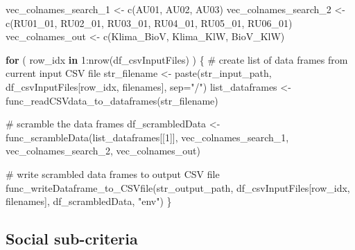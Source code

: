 \documentclass[
]{article}
\newenvironment{Shaded}{\begin{snugshade}}{\end{snugshade}}
\newcommand{\AttributeTok}[1]{\textcolor[rgb]{0.00,0.34,0.68}{#1}}
\newcommand{\CommentTok}[1]{\textcolor[rgb]{0.54,0.53,0.53}{#1}}
\newcommand{\ControlFlowTok}[1]{\textcolor[rgb]{0.12,0.11,0.11}{\textbf{#1}}}
\newcommand{\DecValTok}[1]{\textcolor[rgb]{0.69,0.50,0.00}{#1}}
\newcommand{\FunctionTok}[1]{\textcolor[rgb]{0.39,0.29,0.61}{#1}}
\newcommand{\NormalTok}[1]{\textcolor[rgb]{0.12,0.11,0.11}{#1}}
\newcommand{\OtherTok}[1]{\textcolor[rgb]{0.00,0.43,0.16}{#1}}
\newcommand{\SpecialCharTok}[1]{\textcolor[rgb]{0.24,0.68,0.91}{#1}}
\newcommand{\StringTok}[1]{\textcolor[rgb]{0.75,0.01,0.01}{#1}}
\begin{document}
\begin{Shaded}
\begin{Highlighting}[]
\NormalTok{vec\_colnames\_search\_1 }\OtherTok{\textless{}{-}} \FunctionTok{c}\NormalTok{(}\StringTok{\textquotesingle{}AU01\textquotesingle{}}\NormalTok{, }\StringTok{\textquotesingle{}AU02\textquotesingle{}}\NormalTok{, }\StringTok{\textquotesingle{}AU03\textquotesingle{}}\NormalTok{)}
\NormalTok{vec\_colnames\_search\_2 }\OtherTok{\textless{}{-}} \FunctionTok{c}\NormalTok{(}\StringTok{\textquotesingle{}RU01\_01\textquotesingle{}}\NormalTok{, }\StringTok{\textquotesingle{}RU02\_01\textquotesingle{}}\NormalTok{, }\StringTok{\textquotesingle{}RU03\_01\textquotesingle{}}\NormalTok{, }\StringTok{\textquotesingle{}RU04\_01\textquotesingle{}}\NormalTok{, }\StringTok{\textquotesingle{}RU05\_01\textquotesingle{}}\NormalTok{, }\StringTok{\textquotesingle{}RU06\_01\textquotesingle{}}\NormalTok{)}
\NormalTok{vec\_colnames\_out }\OtherTok{\textless{}{-}} \FunctionTok{c}\NormalTok{(}\StringTok{\textquotesingle{}Klima\_BioV\textquotesingle{}}\NormalTok{, }\StringTok{\textquotesingle{}Klima\_KlW\textquotesingle{}}\NormalTok{, }\StringTok{\textquotesingle{}BioV\_KlW\textquotesingle{}}\NormalTok{)}

\ControlFlowTok{for}\NormalTok{ ( row\_idx }\ControlFlowTok{in} \DecValTok{1}\SpecialCharTok{:}\FunctionTok{nrow}\NormalTok{(df\_csvInputFiles) ) \{}
  \CommentTok{\# create list of data frames from current input CSV file}
\NormalTok{  str\_filename }\OtherTok{\textless{}{-}} \FunctionTok{paste}\NormalTok{(str\_input\_path, df\_csvInputFiles[row\_idx, filenames], }\AttributeTok{sep=}\StringTok{"/"}\NormalTok{)}
\NormalTok{  list\_dataframes }\OtherTok{\textless{}{-}} \FunctionTok{func\_readCSVdata\_to\_dataframes}\NormalTok{(str\_filename)}
  
  \CommentTok{\# scramble the data frames}
\NormalTok{  df\_scrambledData }\OtherTok{\textless{}{-}} \FunctionTok{func\_scrambleData}\NormalTok{(list\_dataframes[[}\DecValTok{1}\NormalTok{]], vec\_colnames\_search\_1, vec\_colnames\_search\_2, vec\_colnames\_out)}
  
  \CommentTok{\# write scrambled data frames to output CSV file}
  \FunctionTok{func\_writeDataframe\_to\_CSVfile}\NormalTok{(str\_output\_path, df\_csvInputFiles[row\_idx, filenames], df\_scrambledData, }\StringTok{"env"}\NormalTok{)}
\NormalTok{\}}
\end{Highlighting}
\end{Shaded}

\hypertarget{social-sub-criteria}{%
\subsection{Social sub-criteria}\label{social-sub-criteria}}
\end{document}
